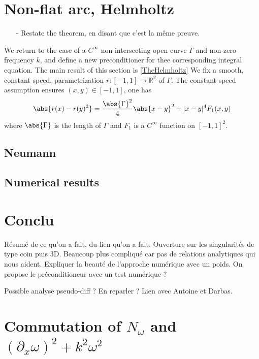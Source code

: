 \documentclass[a4paper]{article}
\begin{document}
	\section{Non-flat arc, Helmholtz}
	
	\begin{itemize}
		\item[-] Restate the theorem, en disant que c'est la même preuve. 
	\end{itemize}
	
	We return to the case of a $C^{\infty}$ non-intersecting open curve $\Gamma$ and non-zero frequency $k$, and define a new preconditioner for thee corresponding integral equation. The main result of this section is \autoref{TheHelmholtz} We fix a smooth, constant speed, parametrization $r : [-1,1] \to \mathbb{R}^2$ of $\Gamma$. The constant-speed assumption ensures $(x,y) \in [-1,1]$, one has
	\begin{equation}
	\abs{r(x) - r(y)^2} = \frac{\abs{\Gamma}^2}{4} \abs{x - y}^2 + |x-y|^4 F_1(x,y)
	\label{DLcourbe_param}
	\end{equation}
	where $\abs{\Gamma}$ is the length of $\Gamma$ and $F_1$ is a $C^{\infty}$ function on $[-1,1]^2$.
	
	
	\subsection{Neumann}
	
	\subsection{Numerical results}
	
	
	\section{Conclu}
	
	Résumé de ce qu'on a fait, du lien qu'on a fait. Ouverture sur les singularités de type coin puis 3D. Beaucoup plus compliqué car pas de relations analytiques qui nous aident. 
	Expliquer la beauté de l'approche numérique avec un poids. On propose le préconditioneur avec un test numérique ? 
	
	Possible analyse pseudo-diff ? En reparler ? Lien avec Antoine et Darbas. 
	
	\section{Commutation of $N_\omega$ and $(\partial_x \omega)^2 + k^2\omega^2$}
	
\end{document}
